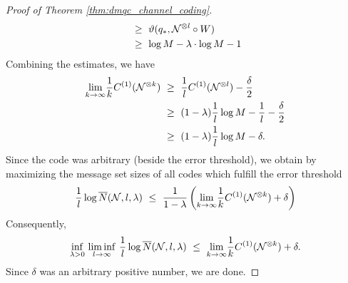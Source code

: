 \begin{proof}[Proof of Theorem \ref{thm:dmqc_channel_coding}]
\begin{align*}
        \ & \geq \ \vartheta(q_{\ast}, {\mathcal N}^{\otimes l} \circ W) \\
        \ & \geq \ \log M - \lambda \cdot \log M - 1 \\
       \end{align*}
        Combining the estimates, we have 
        \begin{align*}
         \underset{k \rightarrow \infty}{\lim} \frac{1}{k} C^{(1)}({\mathcal N}^{\otimes k}) 
         \ & \geq \ \frac{1}{l} C^{(1)}({\mathcal N}^{\otimes l}) - \frac{\delta}{2}  \\
         \ & \geq \ (1- \lambda) \frac{1}{l} \log M - \frac{1}{l} - \frac{\delta}{2} \\ 
         \ & \geq \ (1- \lambda) \frac{1}{l} \log M - \delta.
        \end{align*}
        Since the code was arbitrary (beside the error threshold), we obtain by maximizing the message set sizes of all codes which fulfill the error threshold
        \begin{align*}
         \frac{1}{l} \log \overline{N}(\cN,l, \lambda) \ \leq \ \frac{1}{1-\lambda} \left(\underset{k \rightarrow \infty}{\lim} \frac{1}{k} C^{(1)}(\cN^{\otimes k}) + \delta \right)
        \end{align*}
         Consequently, 
         \begin{align*}
           \underset{\lambda > 0}{\inf} \ \underset{l \rightarrow \infty}{\liminf} \ \frac{1}{l} \log \overline{N}({\mathcal N},l, \lambda) \ \leq \ \underset{k \rightarrow \infty}{\lim} \frac{1}{k} C^{(1)}({\mathcal N}^{\otimes k}) + \delta. 
         \end{align*}
        Since $\delta$ was an arbitrary positive number, we are done.
        \end{proof}

     
    
     
     
     
     